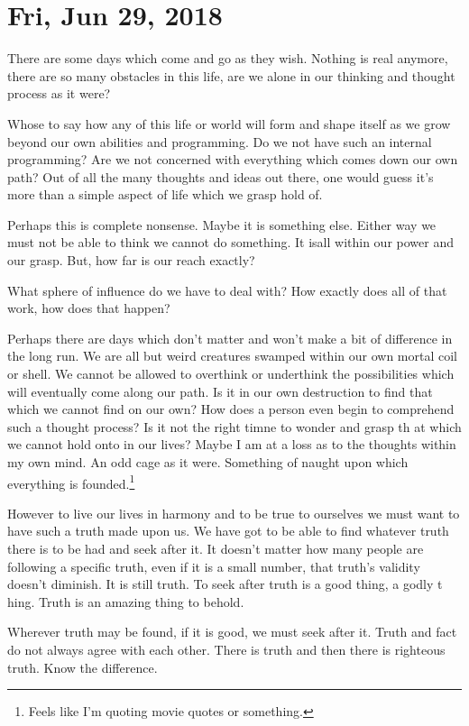 \section{Fri, Jun 29, 2018}

There are some days which come and go as they wish. Nothing is real anymore,
there are so many obstacles in this life, are we alone in our thinking and
thought process as it were?

Whose to say how any of this life or world will form and shape itself as we grow
beyond our own abilities and programming. Do we not have such an internal
programming? Are we not concerned with everything which comes down our own path?
Out of all the many thoughts and ideas out there, one would guess it's more than
a simple aspect of life which we grasp hold of.

Perhaps this is complete nonsense. Maybe it is something else. Either way we
must not be able to think we cannot do something. It isall within our power and
our grasp. But, how far is our reach exactly?

What sphere of influence do we have to deal with? How exactly does all of that
work, how does that happen?

Perhaps there are days which don't matter and won't make a bit of difference in
the long run. We are all but weird creatures swamped within our own mortal coil
or shell. We cannot be allowed to overthink or underthink the possibilities
which will eventually come along our path. Is it in our own destruction to find
that which we cannot find on our own? How does a person even begin to comprehend
such a thought process? Is it not the right timne to wonder and grasp th at
which we cannot hold onto in our lives? Maybe I am at a loss as to the thoughts
within my own mind. An odd cage as it were. Something of naught upon which
everything is founded.\footnote{Feels like I'm quoting movie quotes or something.}

However to live our lives in harmony and to be true to ourselves we must want to
have such a truth made upon us. We have got to be able to find whatever truth
there is to be had and seek after it. It doesn't matter how many people are
following a specific truth, even if it is a small number, that truth's validity
doesn't diminish. It is still truth. To seek after truth is a good thing, a
godly t hing. Truth is an amazing thing to behold.

Wherever truth may be found, if it is good, we must seek after it. Truth and
fact do not always agree with each other. There is truth and then there is
righteous truth. Know the difference.

